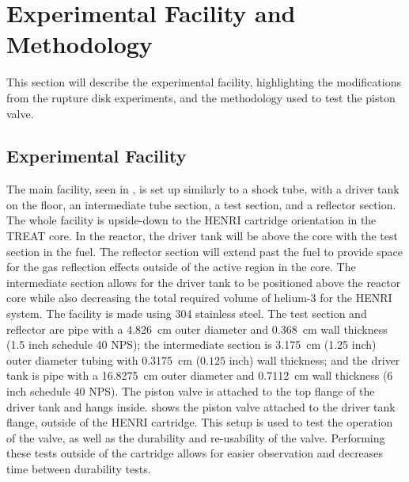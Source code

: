 \section{Experimental Facility and Methodology} \label{s:experiment}

This section will describe the experimental facility, highlighting the modifications from the rupture disk experiments, and the methodology used to test the piston valve.



\subsection{Experimental Facility} \label{ss:facility}

The main facility, seen in , is set up similarly to a shock tube, with a driver tank on the floor, an intermediate tube section, a test section, and a reflector section. The whole facility is upside-down to the HENRI cartridge orientation in the TREAT core. In the reactor, the driver tank will be above the core with the test section in the fuel. The reflector section will extend past the fuel to provide space for the gas reflection effects outside of the active region in the core. The intermediate section allows for the driver tank to be positioned above the reactor core while also decreasing the total required volume of helium-3 for the HENRI system. The facility is made using 304 stainless steel. The test section and reflector are pipe with a \SI{4.826}{\centi\meter} outer diameter and \SI{0.368}{\centi\meter} wall thickness (1.5 inch schedule 40 NPS); the intermediate section is \SI{3.175}{\centi\meter} (1.25 inch) outer diameter tubing with \SI{0.3175}{\centi\meter} ($0.125$ inch) wall thickness; and the driver tank is pipe with a \SI{16.8275}{\centi\meter} outer diameter and \SI{0.7112}{\centi\meter} wall thickness (6 inch schedule 40 NPS). The piston valve is attached to the top flange of the driver tank and hangs inside. shows the piston valve attached to the driver tank flange, outside of the HENRI cartridge. This setup is used to test the operation of the valve, as well as the durability and re-usability of the valve. Performing these tests outside of the cartridge allows for easier observation and decreases time between durability tests.


